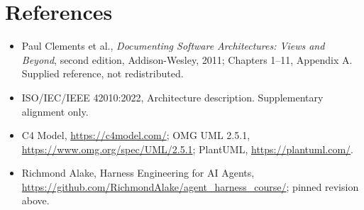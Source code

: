 \documentclass[10pt,letterpaper]{article}
\begin{document}
\section{References}
\begin{itemize}
\item Paul Clements et al., \emph{Documenting Software Architectures: Views and Beyond}, second edition, Addison-Wesley, 2011; Chapters 1--11, Appendix A. Supplied reference, not redistributed.
\item ISO/IEC/IEEE 42010:2022, Architecture description. Supplementary alignment only.
\item C4 Model, \url{https://c4model.com/}; OMG UML 2.5.1, \url{https://www.omg.org/spec/UML/2.5.1}; PlantUML, \url{https://plantuml.com/}.
\item Richmond Alake, Harness Engineering for AI Agents, \url{https://github.com/RichmondAlake/agent_harness_course/}; pinned revision above.
\end{itemize}
\end{document}
